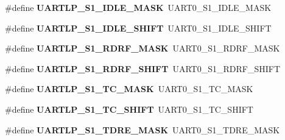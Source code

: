 \begin{DoxyCompactItemize}
\item 
\hypertarget{group___backward___compatibility___symbols_ga96b6b702c4342c4af5004fb48b83efa7}{}\#define {\bfseries U\+A\+R\+T\+L\+P\+\_\+\+S1\+\_\+\+I\+D\+L\+E\+\_\+\+M\+A\+S\+K}~U\+A\+R\+T0\+\_\+\+S1\+\_\+\+I\+D\+L\+E\+\_\+\+M\+A\+S\+K\label{group___backward___compatibility___symbols_ga96b6b702c4342c4af5004fb48b83efa7}

\item 
\hypertarget{group___backward___compatibility___symbols_gae842244614239cddb394428e2e1f8bc0}{}\#define {\bfseries U\+A\+R\+T\+L\+P\+\_\+\+S1\+\_\+\+I\+D\+L\+E\+\_\+\+S\+H\+I\+F\+T}~U\+A\+R\+T0\+\_\+\+S1\+\_\+\+I\+D\+L\+E\+\_\+\+S\+H\+I\+F\+T\label{group___backward___compatibility___symbols_gae842244614239cddb394428e2e1f8bc0}

\item 
\hypertarget{group___backward___compatibility___symbols_gac731a20d480bddb1610a7a740e71ebc9}{}\#define {\bfseries U\+A\+R\+T\+L\+P\+\_\+\+S1\+\_\+\+R\+D\+R\+F\+\_\+\+M\+A\+S\+K}~U\+A\+R\+T0\+\_\+\+S1\+\_\+\+R\+D\+R\+F\+\_\+\+M\+A\+S\+K\label{group___backward___compatibility___symbols_gac731a20d480bddb1610a7a740e71ebc9}

\item 
\hypertarget{group___backward___compatibility___symbols_ga431c49f191f29ccbeade2bd87502531c}{}\#define {\bfseries U\+A\+R\+T\+L\+P\+\_\+\+S1\+\_\+\+R\+D\+R\+F\+\_\+\+S\+H\+I\+F\+T}~U\+A\+R\+T0\+\_\+\+S1\+\_\+\+R\+D\+R\+F\+\_\+\+S\+H\+I\+F\+T\label{group___backward___compatibility___symbols_ga431c49f191f29ccbeade2bd87502531c}

\item 
\hypertarget{group___backward___compatibility___symbols_ga1110069e543f57629a601fabe094b80f}{}\#define {\bfseries U\+A\+R\+T\+L\+P\+\_\+\+S1\+\_\+\+T\+C\+\_\+\+M\+A\+S\+K}~U\+A\+R\+T0\+\_\+\+S1\+\_\+\+T\+C\+\_\+\+M\+A\+S\+K\label{group___backward___compatibility___symbols_ga1110069e543f57629a601fabe094b80f}

\item 
\hypertarget{group___backward___compatibility___symbols_ga61cc5706017331c9f55a89a10c291602}{}\#define {\bfseries U\+A\+R\+T\+L\+P\+\_\+\+S1\+\_\+\+T\+C\+\_\+\+S\+H\+I\+F\+T}~U\+A\+R\+T0\+\_\+\+S1\+\_\+\+T\+C\+\_\+\+S\+H\+I\+F\+T\label{group___backward___compatibility___symbols_ga61cc5706017331c9f55a89a10c291602}

\item 
\hypertarget{group___backward___compatibility___symbols_ga8f434cacc5911ca08ef1e5d0275da950}{}\#define {\bfseries U\+A\+R\+T\+L\+P\+\_\+\+S1\+\_\+\+T\+D\+R\+E\+\_\+\+M\+A\+S\+K}~U\+A\+R\+T0\+\_\+\+S1\+\_\+\+T\+D\+R\+E\+\_\+\+M\+A\+S\+K\label{group___backward___compatibility___symbols_ga8f434cacc5911ca08ef1e5d0275da950}


\end{DoxyCompactItemize}
